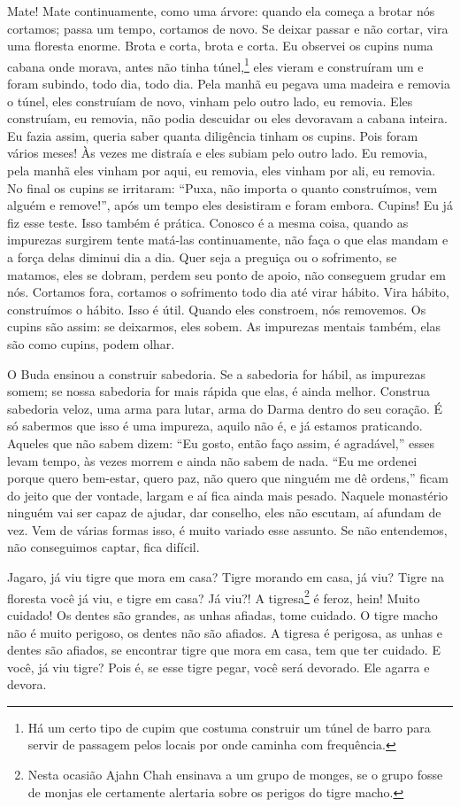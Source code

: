 Mate! Mate continuamente, como uma árvore: quando ela começa a
brotar nós cortamos; passa um tempo, cortamos de novo. Se deixar passar
e não cortar, vira uma floresta enorme. Brota e corta, brota e corta.
Eu observei os cupins numa cabana onde morava, antes não tinha
túnel,\footnote{Há um certo tipo de cupim que costuma construir um túnel
de barro para servir de passagem pelos locais por onde caminha com
frequência.} eles vieram e construíram um e foram subindo, todo dia,
todo dia. Pela manhã eu pegava uma madeira e removia o túnel, eles
construíam de novo, vinham pelo outro lado, eu removia. Eles
construíam, eu removia, não podia descuidar ou eles devoravam a cabana
inteira. Eu fazia assim, queria saber quanta diligência tinham os
cupins. Pois foram vários meses! Às vezes me distraía e eles subiam
pelo outro lado. Eu removia, pela manhã eles vinham por aqui, eu
removia, eles vinham por ali, eu removia. No final os cupins se
irritaram: “Puxa, não importa o quanto construímos, vem alguém e
remove!”, após um tempo eles desistiram e foram embora. Cupins! Eu já
fiz esse teste. Isso também é prática. Conosco é a mesma coisa, quando
as impurezas surgirem tente matá-las continuamente, não faça o que elas
mandam e a força delas diminui dia a dia. Quer seja a preguiça ou o
sofrimento, se matamos, eles se dobram, perdem seu ponto de apoio, não
conseguem grudar em nós. Cortamos fora, cortamos o sofrimento todo dia
até virar hábito. Vira hábito, construímos o hábito. Isso é útil.
Quando eles constroem, nós removemos. Os cupins são assim: se
deixarmos, eles sobem. As impurezas mentais também, elas são como
cupins, podem olhar.

O Buda ensinou a construir sabedoria. Se a sabedoria for hábil, as
impurezas somem; se nossa sabedoria for mais rápida que elas, é ainda
melhor. Construa sabedoria veloz, uma arma para lutar, arma do Darma
dentro do seu coração. É só sabermos que isso é uma impureza, aquilo
não é, e já estamos praticando. Aqueles que não sabem dizem: “Eu gosto,
então faço assim, é agradável,” esses levam tempo, às vezes morrem e
ainda não sabem de nada. “Eu me ordenei porque quero bem-estar, quero
paz, não quero que ninguém me dê ordens,” ficam do jeito que der
vontade, largam e aí fica ainda mais pesado. Naquele monastério ninguém
vai ser capaz de ajudar, dar conselho, eles não escutam, aí afundam de
vez. Vem de várias formas isso, é muito variado esse assunto. Se não
entendemos, não conseguimos captar, fica difícil. 

Jagaro, já viu tigre que mora em casa? Tigre morando em casa, já
viu? Tigre na floresta você já viu, e tigre em casa? Já viu?! A
tigresa\footnote{Nesta ocasião Ajahn Chah ensinava a um grupo de
monges, se o grupo fosse de monjas ele certamente alertaria sobre os
perigos do tigre macho.} é feroz, hein! Muito cuidado! Os dentes são
grandes, as unhas afiadas, tome cuidado. O tigre macho não é muito
perigoso, os dentes não são afiados. A tigresa é perigosa, as unhas e
dentes são afiados, se encontrar tigre que mora em casa, tem que ter
cuidado. E você, já viu tigre? Pois é, se esse tigre pegar, você será
devorado. Ele agarra e devora. 

